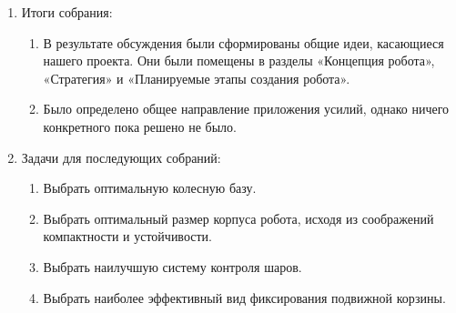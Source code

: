 \begin{enumerate}
	\item Итоги собрания: 
	\begin{enumerate}
	  \item В результате обсуждения были сформированы общие идеи, касающиеся нашего проекта. Они были помещены в разделы «Концепция робота»,  «Стратегия» и «Планируемые этапы создания робота».
	  
      \item Было определено общее направление приложения усилий, однако ничего конкретного пока решено не было.
      
    \end{enumerate}
    
	\item Задачи для последующих собраний:
	\begin{enumerate}
	  \item Выбрать оптимальную колесную базу.
	  
	  \item Выбрать оптимальный размер корпуса робота, исходя из соображений компактности и устойчивости.
	  
	  \item Выбрать наилучшую систему контроля шаров.
	  
	  \item Выбрать наиболее эффективный вид фиксирования подвижной корзины.
	  
    \end{enumerate}
\end{enumerate}
\fillpage


